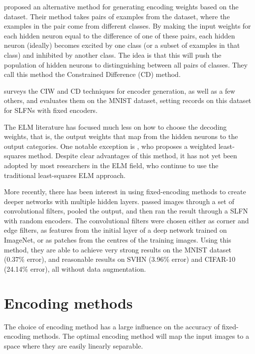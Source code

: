 \textcite{Zhu2015} proposed an alternative method for generating
encoding weights based on the dataset.
Their method takes pairs of examples from the dataset,
where the examples in the pair come from different classes.
By making the input weights for each hidden neuron
equal to the difference of one of these pairs,
each hidden neuron (ideally) becomes excited by one class
(or a subset of examples in that class)
and inhibited by another class.
The idea is that this will push the population of hidden neurons
to distinguishing between all pairs of classes.
They call this method the Constrained Difference (CD) method.

\textcite{McDonnell2015} surveys the CIW and CD techniques for encoder generation,
as well as a few others,
and evaluates them on the MNIST dataset,
setting records on this dataset for SLFNs with fixed encoders.

The ELM literature has focused much less on how to choose the decoding weights,
that is, the output weights that map from the hidden neurons to the output categories.
One notable exception is \textcite{Toh2008},
who proposes a weighted least-squares method.
Despite clear advantages of this method,
it has not yet been adopted by most researchers in the ELM field,
who continue to use the traditional least-squares ELM approach.

More recently, there has been interest in using fixed-encoding methods
to create deeper networks with multiple hidden layers.
\textcite{McDonnell2015a} passed images through a set of convolutional filters,
pooled the output, and then ran the result through a SLFN with random encoders.
The convolutional filters were chosen either as corner and edge filters,
as features from the initial layer of a deep network trained on ImageNet,
or as patches from the centres of the training images.
Using this method, they are able to achieve very strong results
on the MNIST dataset (0.37\% error),
and reasonable results on SVHN (3.96\% error) and CIFAR-10 (24.14\% error),
all without data augmentation.


\section{Encoding methods}


The choice of encoding method has a large influence
on the accuracy of fixed-encoding methods.
The optimal encoding method will map the input images
to a space where they are easily linearly separable.

